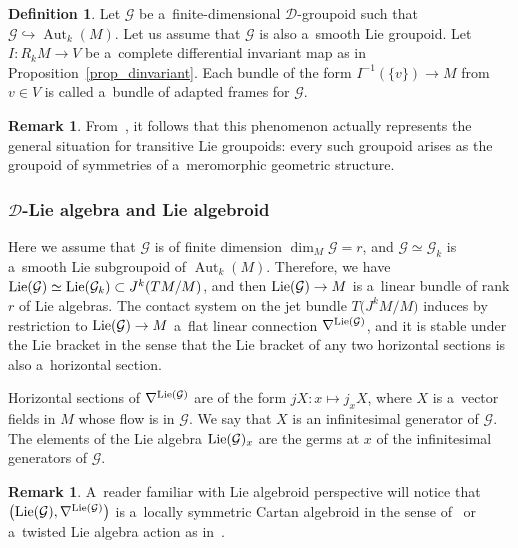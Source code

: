 \documentclass[pdftex]{sigma}
\numberwithin{equation}{section}
\theoremstyle{definition}
\newtheorem{Definition}[Theorem]{Definition}
\newtheorem{Remark}[Theorem]{Remark}
\begin{document}
\begin{Definition}
Let $\mathcal G$ be a~finite-dimensional $\mathcal D$-groupoid such that $\mathcal G\hookrightarrow \operatorname{Aut}_k(M)$. Let us assume that $\mathcal G$ is also a~smooth Lie groupoid. Let $I\colon R_kM \to V$ be a~complete differential invariant map as in Proposition~\ref{prop_dinvariant}. Each bundle of the form $I^{-1}(\{v\})\to M$ from $v\in V$ is called a~bundle of adapted frames for $\mathcal G$.
\end{Definition}

\begin{Remark}
From~\cite{Casale2004SurLG}, it follows that this phenomenon actually represents the general situation for transitive Lie groupoids: every such groupoid arises as the groupoid of symmetries of a~meromorphic geometric structure.
\end{Remark}

\subsubsection[D-Lie algebra and Lie algebroid]{$\boldsymbol{\mathcal D}$-Lie algebra and Lie algebroid}

Here we assume that $\mathcal G$ is of finite dimension $\dim_M\mathcal G = r$, and $\mathcal G \simeq \mathcal G_k$ is a~smooth Lie subgroupoid of $\operatorname{Aut}_k(M)$. Therefore, we have ${\rm Lie}(\mathcal G) \simeq {\rm Lie}(\mathcal G_k) \subset J^k(TM/M)$, and then ${\rm Lie}(\mathcal G)\to M$ is a~linear bundle of rank $r$ of Lie algebras. The contact system on the jet bundle $T\bigl(J^kM/M\bigr)$ induces by restriction to ${\rm Lie}(\mathcal G)\to M$ a~flat linear connection $\nabla^{{\rm Lie}(\mathcal G)}$, and it is stable under the Lie bracket in the sense that the Lie bracket of any two horizontal sections is also a~horizontal section.

Horizontal sections of $\nabla^{{\rm Lie}(\mathcal G)}$ are of the form $jX\colon x\mapsto j_xX$, where $X$ is a~vector fields in $M$ whose flow is in $\mathcal G$. We say that $X$ is an infinitesimal generator of $\mathcal G$. The elements of the Lie algebra ${\rm Lie}(\mathcal G)_x$ are the germs at $x$ of the infinitesimal generators of $\mathcal G$.

\begin{Remark}
A~reader familiar with Lie algebroid perspective will notice that $\bigl({\rm Lie}(\mathcal G), \nabla^{{\rm Lie}(\mathcal G)}\bigr)$ is a~locally symmetric Cartan algebroid in the sense of~\cite[Section~2.5]{blaom2006geometric} or a~twisted Lie algebra action as in~\cite[Section~2.5]{Blaom2016b}.
\end{Remark}
\end{document}
